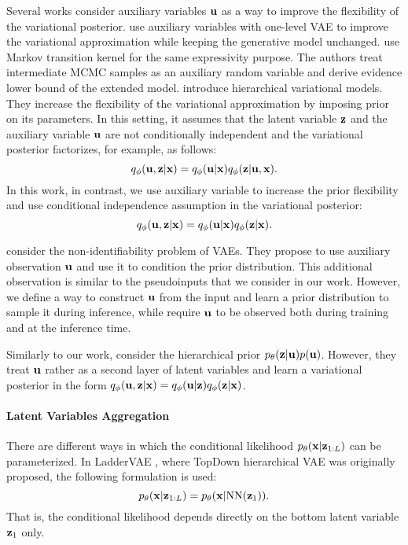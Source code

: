 Several works consider auxiliary variables ${\mathbf{u}}$ as a way to improve the flexibility of the variational posterior.
\citet{maaloe2016auxiliary} use auxiliary variables with one-level VAE to improve the variational approximation while keeping the generative model unchanged. 
\citet{salimans2015markov} use Markov transition kernel for the same expressivity purpose. The authors treat intermediate MCMC samples as an auxiliary random variable and derive evidence lower bound of the extended model. 
\citet{ranganath2016hierarchical} introduce hierarchical variational models. They increase the flexibility of the variational approximation by imposing prior on its parameters. 
In this setting, it assumes that the latent variable ${\mathbf{z}}$ and the auxiliary variable ${\mathbf{u}}$ are not conditionally independent and the variational posterior factorizes, for example, as follows:
\begin{equation}
    q_{\phi}({\mathbf{u}}, {\mathbf{z}}|{\mathbf{x}}) = q_{\phi}({\mathbf{u}}|{\mathbf{x}})q_{\phi}({\mathbf{z}}|{\mathbf{u}}, {\mathbf{x}}).
\end{equation}
In this work, in contrast, we use auxiliary variable to increase the prior flexibility and use conditional independence assumption in the variational posterior:
\begin{equation}
    q_{\phi}({\mathbf{u}}, {\mathbf{z}}|{\mathbf{x}}) = q_{\phi}({\mathbf{u}}|{\mathbf{x}})q_{\phi}({\mathbf{z}}|{\mathbf{x}}).
\end{equation}

\citet{khemakhem2020variational} consider the non-identifiability problem of VAEs. They propose to use auxiliary observation ${\mathbf{u}}$ and use it to condition the prior distribution. This additional observation is similar to the pseudoinputs that we consider in our work. However, we define a way to construct ${\mathbf{u}}$ from the input and learn a prior distribution to sample it during inference, while \citet{khemakhem2020variational} require ${\mathbf{u}}$ to be observed both during training and at the inference time.

Similarly to our work, \citet{klushyn2019learning} consider the hierarchical prior $p_{\theta}({\mathbf{z}}|{\mathbf{u}})p({\mathbf{u}})$. However, they treat ${\mathbf{u}}$ rather as a second layer of latent variables and learn a variational posterior in the form $q_{\phi}({\mathbf{u}}, {\mathbf{z}}|{\mathbf{x}}) = q_{\phi}({\mathbf{u}}|{\mathbf{z}})q_{\phi}({\mathbf{z}}|{\mathbf{x}})$. 

\paragraph{Latent Variables Aggregation}
There are different ways in which the conditional likelihood $p_{\theta}({\mathbf{x}}|{\mathbf{z}}_{1:L})$ can be parameterized. In LadderVAE \citep{sonderby2016ladder}, where TopDown hierarchical VAE was originally proposed, the following formulation is used:
\begin{equation}
    p_{\theta}({\mathbf{x}}|{\mathbf{z}}_{1:L}) = p_{\theta}({\mathbf{x}}|\text{NN}({\mathbf{z}}_{1})).
\end{equation}
That is, the conditional likelihood depends directly on the bottom latent variable ${\mathbf{z}}_{1}$ only. 

